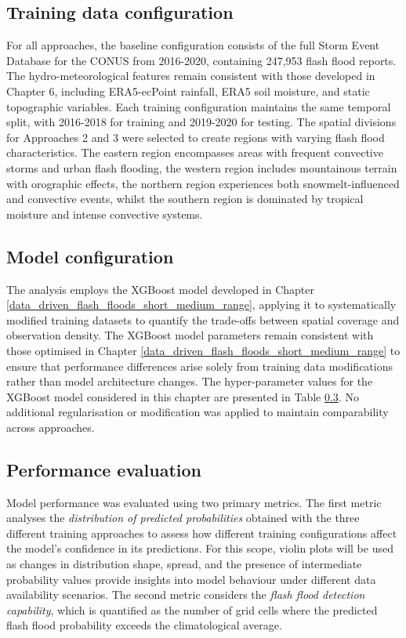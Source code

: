 \subsection{Training data configuration}
For all approaches, the baseline configuration consists of the full Storm Event Database for the CONUS from 2016-2020, containing 247,953 flash flood reports. The hydro-meteorological features remain consistent with those developed in Chapter 6, including ERA5-ecPoint rainfall, ERA5 soil moisture, and static topographic variables. Each training configuration maintains the same temporal split, with 2016-2018 for training and 2019-2020 for testing.
The spatial divisions for Approaches 2 and 3 were selected to create regions with varying flash flood characteristics. The eastern region encompasses areas with frequent convective storms and urban flash flooding, the western region includes mountainous terrain with orographic effects, the northern region experiences both snowmelt-influenced and convective events, whilst the southern region is dominated by tropical moisture and intense convective systems.

\subsection{Model configuration}
The analysis employs the XGBoost model developed in Chapter \ref{data_driven_flash_floods_short_medium_range}, applying it to systematically modified training datasets to quantify the trade-offs between spatial coverage and observation density.
The XGBoost model parameters remain consistent with those optimised in Chapter \ref{data_driven_flash_floods_short_medium_range} to ensure that performance differences arise solely from training data modifications rather than model architecture changes. The hyper-parameter values for the XGBoost model considered in this chapter are presented in Table \ref{}. No additional regularisation or modification was applied to maintain comparability across approaches.

\subsection{Performance evaluation}
Model performance was evaluated using two primary metrics. The first metric analyses the \textit{distribution of predicted probabilities} obtained with the three different training approaches to assess how different training configurations affect the model's confidence in its predictions. For this scope, violin plots will be used as changes in distribution shape, spread, and the presence of intermediate probability values provide insights into model behaviour under different data availability scenarios. The second metric considers the \textit{flash flood detection capability}, which is quantified as the number of grid cells where the predicted flash flood probability exceeds the climatological average. 

